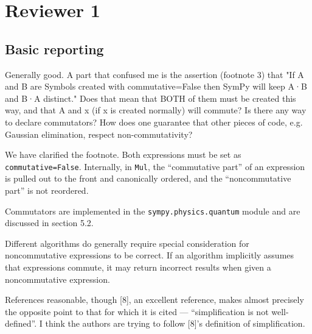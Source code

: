 \documentclass[answers,12pt]{exam}
\begin{document}
\section{Reviewer 1}
\subsection{Basic reporting}
\begin{questions}
\question Generally good. A part that confused me is the assertion (footnote 3) that "If
A and B are Symbols created with commutative=False then SymPy will keep A·B
and B·A distinct." Does that mean that BOTH of them must be created this way,
and that A and x (if x is created normally) will commute? Is there any way to
declare commutators? How does one guarantee that other pieces of code, e.g.
Gaussian elimination, respect non-commutativity?
\begin{solution}
  We have clarified the footnote. Both expressions must be set as
  \texttt{commutative=False}. Internally, in \texttt{Mul}, the ``commutative
  part'' of an expression is pulled out to the front and canonically ordered,
  and the ``noncommutative part'' is not reordered.

Commutators are implemented in the \texttt{sympy.physics.quantum} module and
are discussed in section 5.2.

Different algorithms do generally require special consideration for
noncommutative expressions to be correct. If an algorithm implicitly assumes
that expressions commute, it may return incorrect results when given a
noncommutative expression.
\end{solution}

\question References reasonable, though [8], an excellent reference, makes almost
precisely the opposite point to that for which it is cited --- ``simplification
is not well-defined''. I think the authors are trying to follow [8]'s
definition of simplification.
\begin{solution}
\end{solution}
\end{questions}
\end{document}
